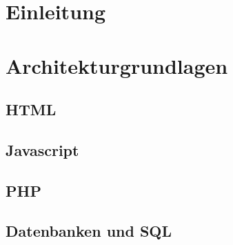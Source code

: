 \section{Einleitung}
\label{sec:Einleitung}

\section{Architekturgrundlagen}
\subsection{HTML}
\subsection{Javascript}
\subsection{PHP}
\subsection{Datenbanken und SQL}
